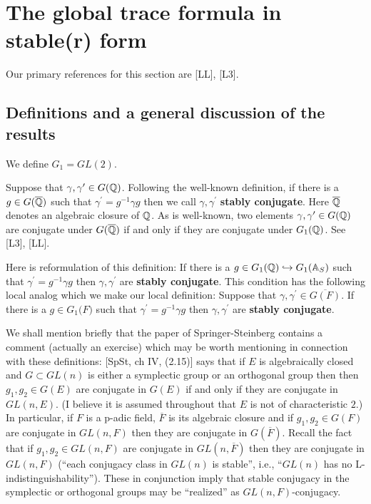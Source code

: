 
\section{The global trace formula in stable(r) form}

Our primary references for this section are [LL], [L3].
\subsection{Definitions and a general discussion of the results}

We define $G_1=GL(2)$. 

Suppose that $\gamma ,\gamma ^{\prime }\in G(\mathbb{Q} )$. Following the
well-known definition, if there is a $g\in G(\overline{\mathbb{Q} })$ such that $%
\gamma ^{\prime }=g^{-1}\gamma g$ then we call $\gamma ,\gamma ^{\prime }$ 
\textbf{stably conjugate}. Here $\overline{\mathbb{Q} }$ denotes an algebraic
closure of $\mathbb{Q} $. As is well-known, two elements $\gamma ,\gamma
^{\prime }\in G(\mathbb{Q} )$ are conjugate under
$G(\overline{\mathbb{Q} })$ if and
only if they are conjugate under $G_1(\mathbb{Q} )$. See [L3], [LL].

Here is reformulation of this definition: If there is a
$g\in G_1(\mathbb{Q} )\hookrightarrow G_1(\mathbb{A} _S)$ such
that $\gamma ^{\prime}=g^{-1}\gamma g$ then
$\gamma ,\gamma ^{\prime }$ are \textbf{stably conjugate}.
This condition has the following local analog which we make our
local definition:
Suppose that $\gamma ,\gamma ^{\prime }\in \overline{G(F)}$. If there
is a $g\in G_1(F\mathbb{)}$ such that 
$\gamma ^{\prime }=g^{-1}\gamma g$ then $\gamma ,\gamma ^{\prime }$ are 
\textbf{stably conjugate}.

\begin{remark}
We shall mention briefly that the paper of Springer-Steinberg
contains a comment (actually an exercise)
which may be worth mentioning in connection with
these definitions: [SpSt, ch IV, (2.15)] says that if $E$ is
algebraically closed and $G\subset GL(n)$ is either a symplectic
group or an orthogonal group then then $g_1,g_2\in G(E)$ are
conjugate in $G(E)$ if and only if they are conjugate in $GL(n,E)$.
(I believe it is assumed throughout that $E$ is not of characteristic $2$.)
In particular, if $F$ is a p-adic field, $\overline{F}$ is its
algebraic closure and if $g_1,g_2\in G(F)$ are conjugate in
$GL(n,F)$ then they are conjugate in $G(\overline{F})$.
Recall the fact that if $g_1,g_2\in GL(n,F)$
are conjugate in $GL(n,\overline{F})$
then they are conjugate in $GL(n,{F})$ (``each conjugacy class
in $GL(n)$ is stable'', i.e., ``$GL(n)$ has no L-indistinguishability'').
These in conjunction imply that stable conjugacy in the
symplectic or orthogonal groups may be ``realized'' as
$GL(n,F)$-conjugacy.
\end{remark}


